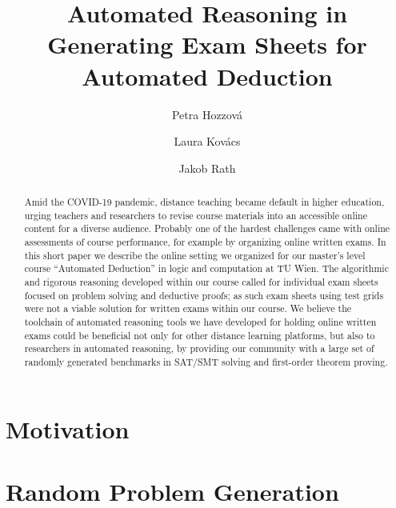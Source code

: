 \documentclass[12pt]{llncs}
\title{Automated Reasoning in Generating Exam Sheets for Automated Deduction}
\author{Petra Hozzov\'a\and
Laura Kov\'acs \and
Jakob Rath}
\institute{
    TU Wien, Austria
}
\begin{document}
\maketitle





\begin{abstract}
Amid the COVID-19 pandemic, distance teaching became default in higher education,
urging teachers and researchers to revise course materials into an
accessible online content for a diverse audience. Probably one of the hardest challenges
came with online assessments of course performance, for example by
organizing online written exams.
In this short paper we describe the online
setting  we organized for our master's level course ``Automated
Deduction'' in logic and computation at TU Wien.
The algorithmic and rigorous reasoning developed within our
course called for individual exam sheets focused on problem solving and deductive
proofs; as such exam sheets using test grids were not a viable solution
for written exams within our course.
We believe the toolchain of automated reasoning tools we have developed for
holding online written exams could be beneficial not only for other
distance learning platforms, but also to researchers in automated
reasoning, by providing our community with a large set of randomly generated benchmarks in SAT/SMT solving and first-order theorem proving.
\end{abstract}





\section{Motivation}





%



\section{Random Problem Generation}\label{sec:satfo}


\end{document}
